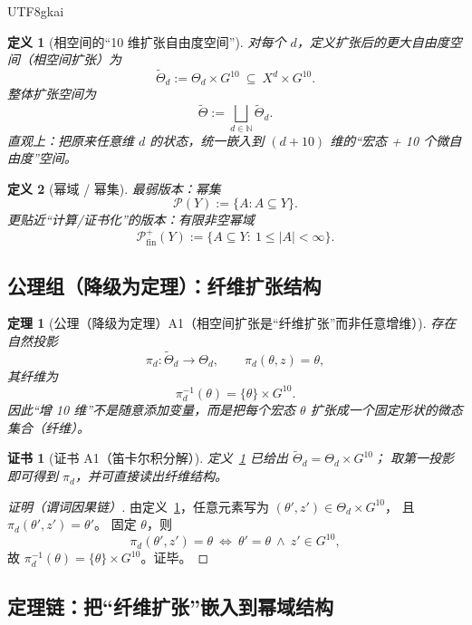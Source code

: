 \documentclass[12pt]{article}
\newtheorem{definition}{定义}[section]
\newtheorem{theorem}{定理}[section]
\newtheorem{Certificate}{证书}[section]
\newcommand{\NN}{\mathbb{N}}
\newcommand{\PP}{\mathcal{P}}
\begin{document}
\begin{CJK*}{UTF8}{gkai}
\begin{definition}[相空间的“10 维扩张自由度空间”]
\label{def:tex27-ch1-extended-space}
对每个 $d$，定义扩张后的更大自由度空间（相空间扩张）为
\[
  \widetilde{\Theta}_d := \Theta_d \times G^{10}
  \ \subseteq\ X^{d}\times G^{10}.
\]
整体扩张空间为
\[
  \widetilde{\Theta} := \bigsqcup_{d\in\NN} \widetilde{\Theta}_d.
\]
直观上：把原来任意维 $d$ 的状态，统一嵌入到 $(d+10)$ 维的“宏态 + 10 个微自由度”空间。
\end{definition}

\begin{definition}[幂域 / 幂集]
\label{def:tex27-ch1-powerdomain}
最弱版本：幂集
\[
  \PP(Y):=\{A: A\subseteq Y\}.
\]
更贴近“计算/证书化”的版本：有限非空幂域
\[
  \PP_{\mathrm{fin}}^{+}(Y):=\{A\subseteq Y:\ 1\le |A|<\infty\}.
\]
\end{definition}

\subsection{公理组（降级为定理）：纤维扩张结构}
\label{subsec:tex27-ch1-axioms}

\begin{theorem}[公理（降级为定理）A1（相空间扩张是“纤维扩张”而非任意增维）]
\label{thm:tex27-ch1-a1}
存在自然投影
\[
  \pi_d:\widetilde{\Theta}_d\to\Theta_d,\qquad \pi_d(\theta,z)=\theta,
\]
其纤维为
\[
  \pi_d^{-1}(\theta)=\{\theta\}\times G^{10}.
\]
因此“增 10 维”不是随意添加变量，而是把每个宏态 $\theta$ 扩张成一个固定形状的微态集合（纤维）。
\end{theorem}

\begin{Certificate}[证书 A1（笛卡尔积分解）]
\label{cert:tex27-ch1-a1}
定义~\ref{def:tex27-ch1-extended-space} 已给出 $\widetilde{\Theta}_d=\Theta_d\times G^{10}$；
取第一投影即可得到 $\pi_d$，并可直接读出纤维结构。
\end{Certificate}

\begin{proof}[证明（谓词因果链）]
由定义~\ref{def:tex27-ch1-extended-space}，任意元素写为 $(\theta',z')\in\Theta_d\times G^{10}$，
且 $\pi_d(\theta',z')=\theta'$。
固定 $\theta$，则
\[
  \pi_d(\theta',z')=\theta\ \Longleftrightarrow\ \theta'=\theta\ \wedge\ z'\in G^{10},
\]
故 $\pi_d^{-1}(\theta)=\{\theta\}\times G^{10}$。证毕。
\end{proof}

\subsection{定理链：把“纤维扩张”嵌入到幂域结构}
\label{subsec:tex27-ch1-theorems}


\end{CJK*}
\end{document}
